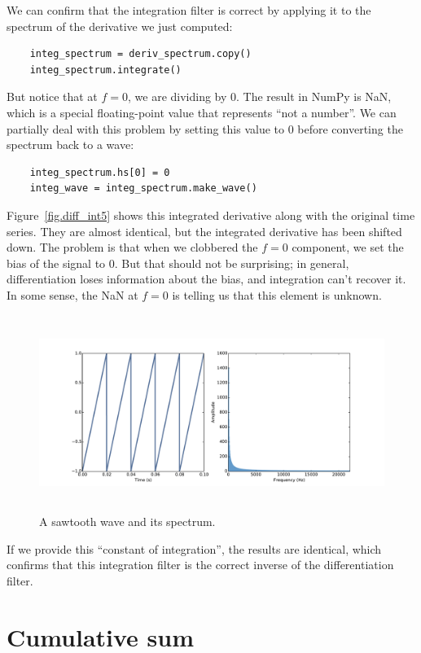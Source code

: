 \documentclass[12pt]{book}
\begin{document}
We can confirm that the integration filter is correct by applying it
to the spectrum of the derivative we just computed:

\begin{verbatim}
    integ_spectrum = deriv_spectrum.copy()
    integ_spectrum.integrate()
\end{verbatim}

But notice that at $f=0$, we are dividing by 0.  The result in
NumPy is NaN, which is a special floating-point value that
represents ``not a number''.  We can partially deal with this
problem by setting this value to 0 before converting the
spectrum back to a wave:

\begin{verbatim}
    integ_spectrum.hs[0] = 0
    integ_wave = integ_spectrum.make_wave()
\end{verbatim}

Figure~\ref{fig.diff_int5} shows this integrated derivative along with
the original time series.  They are almost identical, but the
integrated derivative has been shifted down.  The problem is that when
we clobbered the $f=0$ component, we set the bias of the signal to 0.
But that should not be surprising; in general, differentiation loses
information about the bias, and integration can't recover it.  In some
sense, the NaN at $f=0$ is telling us that this element is unknown.

\begin{figure}
\centerline{\includegraphics[height=2.5in]{figs/diff_int6.pdf}}
\caption{A sawtooth wave and its spectrum.}
\label{fig.diff_int6}
\end{figure}

If we provide this ``constant of integration'', the results are
identical, which confirms that this integration filter is the correct
inverse of the differentiation filter.

\section{Cumulative sum}
\label{cumsum}
\end{document}
